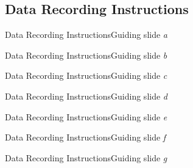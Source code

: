 \subsection{Data Recording Instructions}

\begin{frame}{Data Recording Instructions}{Guiding slide \textit{a}}
    \begin{center}
    \end{center}
\end{frame}

\begin{frame}{Data Recording Instructions}{Guiding slide \textit{b}}
    \begin{center}
    \end{center}
\end{frame}

\begin{frame}{Data Recording Instructions}{Guiding slide \textit{c}}
    \begin{center}
    \end{center}
\end{frame}

\begin{frame}{Data Recording Instructions}{Guiding slide \textit{d}}
    \begin{center}
    \end{center}
\end{frame}

\begin{frame}{Data Recording Instructions}{Guiding slide \textit{e}}
    \begin{center}
    \end{center}
\end{frame}

\begin{frame}{Data Recording Instructions}{Guiding slide \textit{f}}
    \begin{center}
    \end{center}
\end{frame}

\begin{frame}{Data Recording Instructions}{Guiding slide \textit{g}}
    \begin{center}
    \end{center}
\end{frame}

